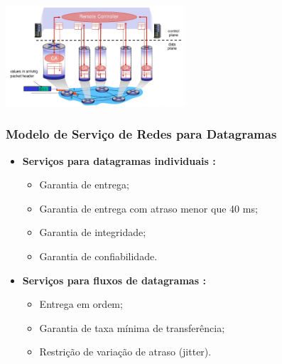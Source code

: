 \begin{itemize}[left=0.5cm, align=left, nosep]
\begin{enumerate}[left=0.5cm, align=left, nosep]
                    \begin{center}
                        \includegraphics[width=0.5\textwidth]{img/cap-04/sdn.png}
                    \end{center}
                
                \end{enumerate}

            \end{itemize}

        \subsubsection*{Modelo de Serviço de Redes para Datagramas}
            \begin{itemize}[left=0.5cm, align=left, nosep]
                \item \textbf{Serviços para datagramas individuais :}
                    \begin{itemize}[left=0.5cm, nosep, label=$\hookrightarrow$]
                        \item Garantia de entrega; 
                        \item Garantia de entrega com atraso menor que 40 ms; 
                        \item Garantia de integridade; 
                        \item Garantia de confiabilidade.
                    \end{itemize} 
                     
                \item \textbf{Serviços para fluxos de datagramas :}
                    \begin{itemize}[left=0.5cm, nosep, label=$\hookrightarrow$]
                        \item Entrega em ordem;
                        \item Garantia de taxa mínima de transferência; 
                        \item Restrição de variação de atraso (jitter).
                    \end{itemize} 
                     
            \end{itemize}


